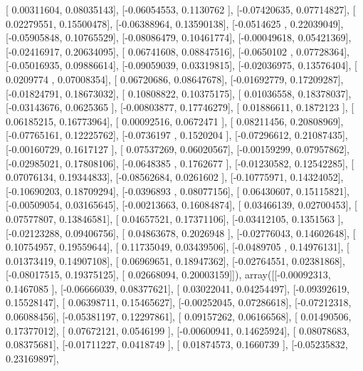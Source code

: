 \documentclass{article}
\begin{document}
       [ 0.00311604,  0.08035143],
       [-0.06054553,  0.1130762 ],
       [-0.07420635,  0.07714827],
       [ 0.02279551,  0.15500478],
       [-0.06388964,  0.13590138],
       [-0.0514625 ,  0.22039049],
       [-0.05905848,  0.10765529],
       [-0.08086479,  0.10461774],
       [-0.00049618,  0.05421369],
       [-0.02416917,  0.20634095],
       [ 0.06741608,  0.08847516],
       [-0.0650102 ,  0.07728364],
       [-0.05016935,  0.09886614],
       [-0.09059039,  0.03319815],
       [-0.02036975,  0.13576404],
       [ 0.0209774 ,  0.07008354],
       [ 0.06720686,  0.08647678],
       [-0.01692779,  0.17209287],
       [-0.01824791,  0.18673032],
       [ 0.10808822,  0.10375175],
       [ 0.01036558,  0.18378037],
       [-0.03143676,  0.0625365 ],
       [-0.00803877,  0.17746279],
       [ 0.01886611,  0.1872123 ],
       [ 0.06185215,  0.16773964],
       [ 0.00092516,  0.0672471 ],
       [ 0.08211456,  0.20808969],
       [-0.07765161,  0.12225762],
       [-0.0736197 ,  0.1520204 ],
       [-0.07296612,  0.21087435],
       [-0.00160729,  0.1617127 ],
       [ 0.07537269,  0.06020567],
       [-0.00159299,  0.07957862],
       [-0.02985021,  0.17808106],
       [-0.0648385 ,  0.1762677 ],
       [-0.01230582,  0.12542285],
       [ 0.07076134,  0.19344833],
       [-0.08562684,  0.0261602 ],
       [-0.10775971,  0.14324052],
       [-0.10690203,  0.18709294],
       [-0.0396893 ,  0.08077156],
       [ 0.06430607,  0.15115821],
       [-0.00509054,  0.03165645],
       [-0.00213663,  0.16084874],
       [ 0.03466139,  0.02700453],
       [ 0.07577807,  0.13846581],
       [ 0.04657521,  0.17371106],
       [-0.03412105,  0.1351563 ],
       [-0.02123288,  0.09406756],
       [ 0.04863678,  0.2026948 ],
       [-0.02776043,  0.14602648],
       [ 0.10754957,  0.19559644],
       [ 0.11735049,  0.03439506],
       [-0.0489705 ,  0.14976131],
       [ 0.01373419,  0.14907108],
       [ 0.06969651,  0.18947362],
       [-0.02764551,  0.02381868],
       [-0.08017515,  0.19375125],
       [ 0.02668094,  0.20003159]]), array([[-0.00092313,  0.1467085 ],
       [-0.06666039,  0.08377621],
       [ 0.03022041,  0.04254497],
       [-0.09392619,  0.15528147],
       [ 0.06398711,  0.15465627],
       [-0.00252045,  0.07286618],
       [-0.07212318,  0.06088456],
       [-0.05381197,  0.12297861],
       [ 0.09157262,  0.06166568],
       [ 0.01490506,  0.17377012],
       [ 0.07672121,  0.0546199 ],
       [-0.00600941,  0.14625924],
       [ 0.08078683,  0.08375681],
       [-0.01711227,  0.0418749 ],
       [ 0.01874573,  0.1660739 ],
       [-0.05235832,  0.23169897],
\end{document}
